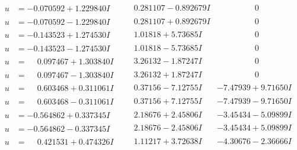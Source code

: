 \documentclass[1p]{elsarticle_modified}
\theoremstyle{definition}
\begin{document}
$$\begin{array}{c|c|c}
\begin{aligned}
u &= -0.070592 + 1.229840 I\end{aligned}
 & \phantom{-}0.281107 - 0.892679 I & \phantom{-0.000000 } 0 \\ \hline\begin{aligned}
u &= -0.070592 - 1.229840 I\end{aligned}
 & \phantom{-}0.281107 + 0.892679 I & \phantom{-0.000000 } 0 \\ \hline\begin{aligned}
u &= -0.143523 + 1.274530 I\end{aligned}
 & \phantom{-}1.01818 + 5.73685 I & \phantom{-0.000000 } 0 \\ \hline\begin{aligned}
u &= -0.143523 - 1.274530 I\end{aligned}
 & \phantom{-}1.01818 - 5.73685 I & \phantom{-0.000000 } 0 \\ \hline\begin{aligned}
u &= \phantom{-}0.097467 + 1.303840 I\end{aligned}
 & \phantom{-}3.26132 - 1.87247 I & \phantom{-0.000000 } 0 \\ \hline\begin{aligned}
u &= \phantom{-}0.097467 - 1.303840 I\end{aligned}
 & \phantom{-}3.26132 + 1.87247 I & \phantom{-0.000000 } 0 \\ \hline\begin{aligned}
u &= \phantom{-}0.603468 + 0.311061 I\end{aligned}
 & \phantom{-}0.37156 - 7.12755 I & -7.47939 + 9.71650 I \\ \hline\begin{aligned}
u &= \phantom{-}0.603468 - 0.311061 I\end{aligned}
 & \phantom{-}0.37156 + 7.12755 I & -7.47939 - 9.71650 I \\ \hline\begin{aligned}
u &= -0.564862 + 0.337345 I\end{aligned}
 & \phantom{-}2.18676 + 2.45806 I & -3.45434 - 5.09899 I \\ \hline\begin{aligned}
u &= -0.564862 - 0.337345 I\end{aligned}
 & \phantom{-}2.18676 - 2.45806 I & -3.45434 + 5.09899 I \\ \hline\begin{aligned}
u &= \phantom{-}0.421531 + 0.474326 I\end{aligned}
 & \phantom{-}1.11217 + 3.72638 I & -4.30676 - 2.36666 I \\ \hline\begin{aligned}

\end{aligned}
\end{array}$$
\end{document}
